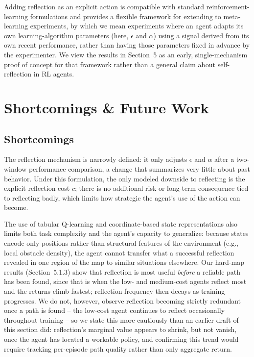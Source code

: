 \documentclass[11pt]{article}
\begin{document}
Adding reflection as an explicit action is compatible with standard reinforcement-learning formulations and provides a flexible framework for extending to meta-learning experiments, by which we mean experiments where an agent adapts its own learning-algorithm parameters (here, $\epsilon$ and $\alpha$) using a signal derived from its own recent performance, rather than having those parameters fixed in advance by the experimenter. We view the results in Section~5 as an early, single-mechanism proof of concept for that framework rather than a general claim about self-reflection in RL agents.

\section{Shortcomings \& Future Work}

\subsection{Shortcomings}

The reflection mechanism is narrowly defined: it only adjusts $\epsilon$ and $\alpha$ after a two-window performance comparison, a change that summarizes very little about past behavior. Under this formulation, the only modeled downside to reflecting is the explicit reflection cost $c$; there is no additional risk or long-term consequence tied to reflecting badly, which limits how strategic the agent's use of the action can become.

The use of tabular Q-learning and coordinate-based state representations also limits both task complexity and the agent's capacity to generalize: because states encode only positions rather than structural features of the environment (e.g., local obstacle density), the agent cannot transfer what a successful reflection revealed in one region of the map to similar situations elsewhere. Our hard-map results (Section~5.1.3) show that reflection is most useful \emph{before} a reliable path has been found, since that is when the low- and medium-cost agents reflect most and the returns climb fastest; reflection frequency then decays as training progresses. We do not, however, observe reflection becoming strictly redundant once a path is found -- the low-cost agent continues to reflect occasionally throughout training -- so we state this more cautiously than an earlier draft of this section did: reflection's marginal value appears to shrink, but not vanish, once the agent has located a workable policy, and confirming this trend would require tracking per-episode path quality rather than only aggregate return.
\end{document}

